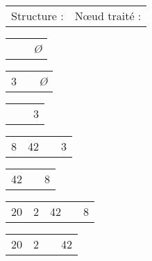 \documentclass[11pt,a4paper]{article}
\begin{document}
\begin{center}

\begin{table}[ht!]
  \centering
  \begin{minipage}{0.45\textwidth}

\begin{tabular}{ L{4cm} L{2.5cm} }
Structure : & N\oe{}ud traité : \\
\end{tabular}

\smallskip

\begin{tabular}{ |C{0.5cm}| C{3cm} L{2cm} }
 & & \textit{Ø} \\
\end{tabular}

\medskip

\begin{tabular}{ |C{0.5cm}| C{3cm} L{2cm} }
3 & & \textit{Ø} \\
\end{tabular}

\medskip

\begin{tabular}{ |C{0.5cm}| C{3cm} L{2cm} }
 & & 3 \\
\end{tabular}

\bigskip

\begin{tabular}{ |C{0.5cm}|C{0.5cm}| C{2cm} L{2cm} }
8 & 42 & & 3 \\
\end{tabular}

\bigskip

\begin{tabular}{ |C{0.5cm}| C{3cm} L{2cm} }
42 & & 8 \\
\end{tabular}

\bigskip

\begin{tabular}{ |C{0.5cm}|C{0.5cm}|C{0.5cm}| C{1cm} L{2cm} }
20 & 2 & 42 & & 8 \\
\end{tabular}

\bigskip

\begin{tabular}{ |C{0.5cm}|C{0.5cm}| C{2cm} L{2cm} }
20 & 2 & & 42 \\
\end{tabular}


\end{minipage}
\end{table}
\end{center}
\end{document}
